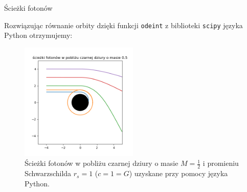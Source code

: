 \documentclass[polish, 9pt, xcolor=table, hyperref={pdfpagemode=FullScreen}]{beamer}
\begin{document}
\begin{frame}{Ścieżki fotonów}

Rozwiązując równanie orbity dzięki funkcji  \texttt{odeint} z biblioteki \texttt{scipy} języka Python otrzymujemy:

\begin{figure}[h]
  \centering
  \includegraphics[width=0.5\textwidth]{ilustracje/sceizki_wykres.png}
  \caption{Ścieżki fotonów w pobliżu czarnej dziury o masie $M=\frac{1}{2}$ i promieniu Schwarzschilda $r_s=1$ ($c=1=G$) uzyskane przy pomocy języka Python.}
\end{figure}

\end{frame}
\end{document}
